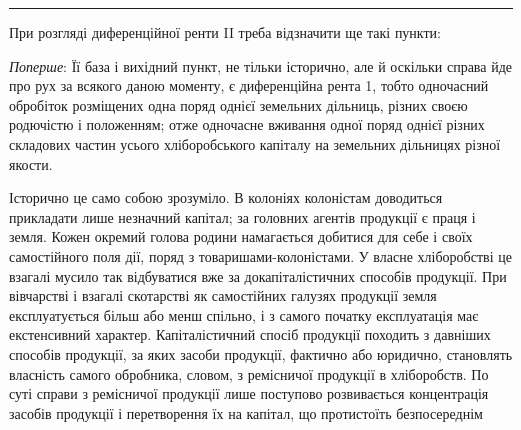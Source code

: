 \pfbreak

При розгляді диференційної ренти II треба відзначити ще такі пункти:

\emph{Поперше}: Її база і вихідний пункт, не тільки історично, але й оскільки
справа йде про рух за всякого даною моменту, є диференційна рента 1, тобто
одночасний обробіток розміщених одна поряд однієї земельних дільниць, різних
своєю родючістю і положенням; отже одночасне вживання одної поряд однієї
різних складових частин усього хліборобського капіталу на земельних дільницях
різної якости.

Історично це само собою зрозуміло. В колоніях колоністам доводиться прикладати
лише незначний капітал; за головних агентів продукції є праця і земля.
Кожен окремий голова родини намагається добитися для себе і своїх самостійного
поля дії, поряд з товаришами-колоністами. У власне хліборобстві це
взагалі мусило так відбуватися вже за докапіталістичних способів продукції. При
вівчарстві і взагалі скотарстві як самостійних галузях продукції земля експлуатується
більш або менш спільно, і з самого початку експлуатація має екстенсивний
характер. Капіталістичний спосіб продукції походить з давніших способів
продукції, за яких засоби продукції, фактично або юридично, становлять
власність самого обробника, словом, з ремісничої продукції в хліборобств. По
суті справи з ремісничої продукції лише поступово розвивається концентрація
засобів продукції і перетворення їх на капітал, що протистоїть безпосереднім
\parbreak{}  %
